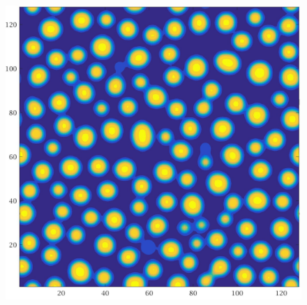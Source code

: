 \documentclass[a4paper,6pt]{article}
\begin{document}
\begin{figure}[H]
\begin{minipage}[b]{.32\linewidth}
        \end{minipage}
                \begin{minipage}[b]{.32\linewidth}
                \centering
                \includegraphics[width=1\textwidth]{pics/C1_t3.jpg}
        \end{minipage}
        

\end{figure}
\end{document}
